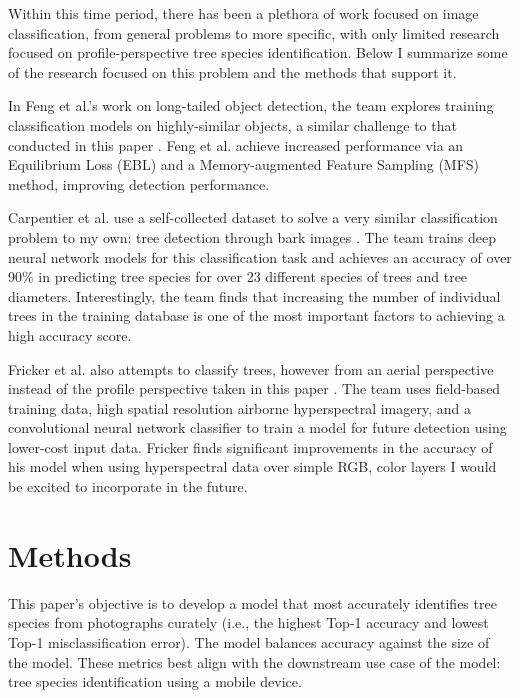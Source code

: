 \documentclass[10pt,twocolumn,letterpaper]{article}
\begin{document}
Within this time period, there has been a plethora of work focused on image classification, from general problems to more specific, with only limited research focused on profile-perspective tree species identification. Below I summarize some of the research focused on this problem and the methods that support it. 

In Feng et al.'s work on long-tailed object detection, the team explores training classification models on highly-similar objects, a similar challenge to that conducted in this paper \cite{Feng_2021_ICCV}. Feng et al. achieve increased performance via an Equilibrium Loss (EBL) and a Memory-augmented Feature Sampling (MFS) method, improving detection performance.

Carpentier et al. use a self-collected dataset to solve a very similar classification problem to my own: tree detection through bark images \cite{Carpentier_2018}. The team trains deep neural network models for this classification task and achieves an accuracy of over 90\% in predicting tree species for over 23 different species of trees and tree diameters. Interestingly, the team finds that increasing the number of individual trees in the training database is one of the most important factors to achieving a high accuracy score.

Fricker et al. also attempts to classify trees, however from an aerial perspective instead of the profile perspective taken in this paper \cite{Fricker_RS_2019}. The team uses field-based training data, high spatial resolution airborne hyperspectral imagery, and a convolutional neural network classifier to train a model for future detection using lower-cost input data. Fricker finds significant improvements in the accuracy of his model when using hyperspectral data over simple RGB, color layers I would be excited to incorporate in the future.

\section{Methods}
\label{sec:methods}
This paper's objective is to develop a model that most accurately identifies tree species from photographs curately (i.e., the highest Top-1 accuracy and lowest Top-1 misclassification error). The model balances accuracy against the size of the model. These metrics best align with the downstream use case of the model: tree species identification using a mobile device. 
\end{document}

